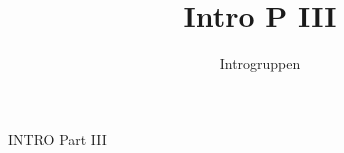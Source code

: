 \documentclass[a4paper]{article}
\title{Intro P III}
\author{Introgruppen}
\begin{document}
\maketitle

\begin{sketch}
  \begin{center}\begin{Huge}
      \vspace{7cm}
      INTRO Part III
    \end{Huge}\end{center}
\end{sketch}
\end{document}
